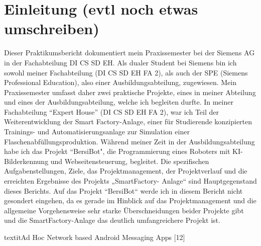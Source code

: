 \chapter{Einleitung (evtl noch etwas umschreiben)}\label{ch:data}

\label{sec:Einleitung}

Dieser Praktikumsbericht dokumentiert mein Praxissemester bei der Siemens AG in der Fachabteilung DI CS SD EH.
Als dualer Student bei Siemens bin ich sowohl meiner Fachabteilung (DI CS SD EH FA 2), als auch der SPE  (Siemens Professional Education), also einer Ausbildungsabteilung, zugewiesen.
Mein Praxissemester umfasst daher zwei praktische Projekte, eines in meiner Abteilung und eines der Ausbildungsabteilung, welche ich begleiten durfte. In meiner Fachabteilung “Expert House” (DI CS SD EH FA 2), war ich Teil der Weiterentwicklung der Smart Factory-Anlage, einer für Studierende konzipierten Trainings- und Automatisierungsanlage zur Simulation einer Flaschenabfüllungsproduktion. Während meiner Zeit in der Ausbildungsabteilung habe ich das Projekt “BersiBot", die Programmierung eines Roboters mit KI-Bilderkennung und Webseitensteuerung, begleitet.
Die spezifischen Aufgabenstellungen, Ziele, das Projektmanagement,
der Projektverlauf und die erreichten Ergebnisse des Projekts „SmartFactory-
Anlage“ sind Hauptgegenstand dieses Berichts. Auf das Projekt “BersiBot“ werde
ich in diesem Bericht nicht gesondert eingehen, da es gerade im Hinblick auf das
Projektmanagement und die allgemeine Vorgehensweise sehr starke
Überschneidungen beider Projekte gibt und die SmartFactory-Anlage das deutlich
umfangreichere Projekt ist.

textit{Ad Hoc Network based Android Messaging Apps} [12] 
